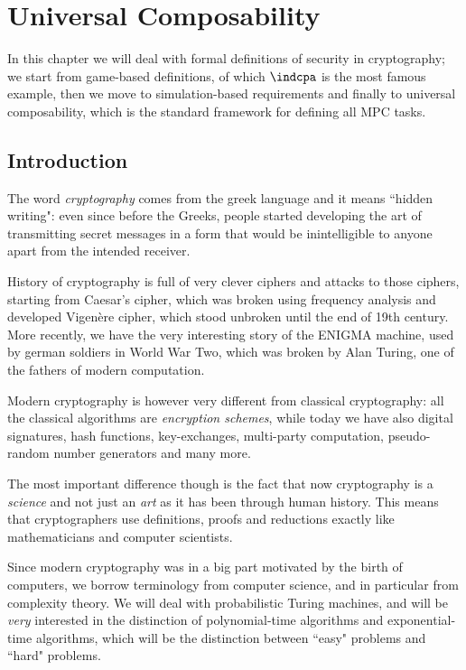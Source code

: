\chapter{Universal Composability}

In this chapter we will deal with formal definitions of security in cryptography; we start from game-based definitions, of which $\indcpa$ is the most famous example, then we move to simulation-based requirements and finally to universal composability, which is the standard framework for defining all MPC tasks.

\section{Introduction}
The word \emph{cryptography} comes from the greek language and it means ``hidden writing": even since before the Greeks, people started developing the art of transmitting secret messages in a form that would be inintelligible to anyone apart from the intended receiver.

History of cryptography is full of very clever ciphers and attacks to those ciphers, starting from Caesar's cipher, which was  broken  using frequency analysis and developed Vigenère cipher, which stood unbroken until the end of 19th century. More recently, we have the very interesting story of the ENIGMA machine, used by german soldiers in World War Two, which was broken by Alan Turing, one of the fathers of modern computation.

Modern cryptography is however very different from classical cryptography: all the classical algorithms are \emph{encryption schemes}, while today we have also digital signatures, hash functions, key-exchanges, multi-party computation, pseudo-random number generators and many more.

The most important difference though is the fact that now cryptography is a \emph{science} and not just an \emph{art} as it has been through human history. This means that cryptographers use definitions, proofs and reductions exactly like mathematicians and computer scientists.

Since modern cryptography was in a big part motivated by the birth of computers, we borrow terminology from computer science, and in particular from complexity theory. We will deal with probabilistic Turing machines, and will be \emph{very} interested in the distinction of polynomial-time algorithms and exponential-time algorithms, which will be the distinction between ``easy" problems and ``hard" problems.

